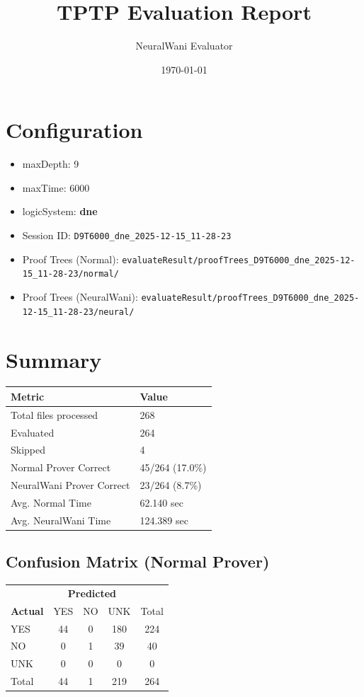 \documentclass[a4paper,10pt]{article}
\title{TPTP Evaluation Report}
\author{NeuralWani Evaluator}
\date{\today}
\begin{document}
\maketitle

\section{Configuration}
\begin{itemize}
\item maxDepth: 9
\item maxTime: 6000
\item logicSystem: \textbf{dne}
\item Session ID: \texttt{D9T6000\_dne\_2025-12-15\_11-28-23}
\item Proof Trees (Normal): \texttt{evaluateResult/proofTrees\_D9T6000\_dne\_2025-12-15\_11-28-23/normal/}
\item Proof Trees (NeuralWani): \texttt{evaluateResult/proofTrees\_D9T6000\_dne\_2025-12-15\_11-28-23/neural/}
\end{itemize}

\section{Summary}

\begin{tabular}{ll}
\toprule
\textbf{Metric} & \textbf{Value} \\
\midrule
Total files processed & 268 \\
Evaluated & 264 \\
Skipped & 4 \\
\midrule
Normal Prover Correct & 45/264 (17.0\%) \\
NeuralWani Prover Correct & 23/264 (8.7\%) \\
\midrule
Avg. Normal Time & 62.140 sec \\
Avg. NeuralWani Time & 124.389 sec \\
\bottomrule
\end{tabular}

\subsection{Confusion Matrix (Normal Prover)}

\begin{tabular}{l|ccc|c}
\toprule
 & \multicolumn{3}{c|}{\textbf{Predicted}} & \\
\textbf{Actual} & YES & NO & UNK & Total \\
\midrule
YES & 44 & 0 & 180 & 224 \\
NO & 0 & 1 & 39 & 40 \\
UNK & 0 & 0 & 0 & 0 \\
\midrule
Total & 44 & 1 & 219 & 264 \\
\bottomrule
\end{tabular}
\end{document}
